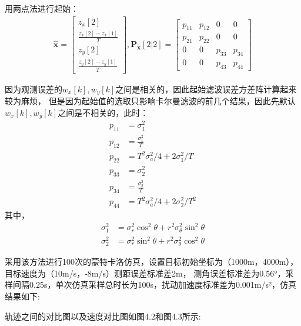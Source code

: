\documentclass[fontset=windows]{article}
\numberwithin{figure}{section}
\begin{document}
用两点法进行起始：
\begin{align*}
    \hat{\mathbf{x}}=
    \begin{bmatrix}
        z_x[2]                  \\
        \frac{z_x[2]-z_x[1]}{T} \\
        z_y[2]                  \\
        \frac{z_y[2]-z_y[1]}{T}
    \end{bmatrix},
    \mathbf{P}_{\hat{\mathbf{x}}}[2|2]=
    \begin{bmatrix}
        p_{11} & p_{12} & 0      & 0      \\
        p_{21} & p_{22} & 0      & 0      \\
        0      & 0      & p_{33} & p_{34} \\
        0      & 0      & p_{43} & p_{44}
    \end{bmatrix}
\end{align*}

因为观测误差的\(w_x[k],w_y[k]\)之间是相关的，因此起始滤波误差方差阵计算起来较为麻烦，
但是因为起始值的选取只影响卡尔曼滤波的前几个结果，因此先默认\(w_x[k],w_y[k]\)之间是不相关的，此时：
\begin{align*}
    p_{11} & =\sigma^2_1                      \\
    p_{12} & =\frac{\sigma^2_1}{T}            \\
    p_{22} & =T^2\sigma^2_a/4+2\sigma^2_1/T   \\
    p_{33} & =\sigma^2_2                      \\
    p_{34} & =\frac{\sigma^2_2}{T}            \\
    p_{44} & =T^2\sigma^2_a/4+2\sigma^2_2/T^2
\end{align*}
其中，
\begin{align*}
    \sigma_1^2 & =\sigma^2_r\cos^2\theta+r^2\sigma^2_{\theta}\sin^2\theta \\
    \sigma^2_2 & =\sigma^2_r\sin^2\theta+r^2\sigma^2_{\theta}\cos^2\theta
\end{align*}

采用该方法进行100次的蒙特卡洛仿真，设置目标初始坐标为（1000m，4000m），目标速度为（10m/s，-8m/s）测距误差标准差2m，
测角误差标准差为0.56°，采样间隔0.25s，单次仿真采样总时长为100s，扰动加速度标准差为0.001m/s²，仿真结果如下:

轨迹之间的对比图以及速度对比图如图4.2和图4.3所示:
\end{document}
